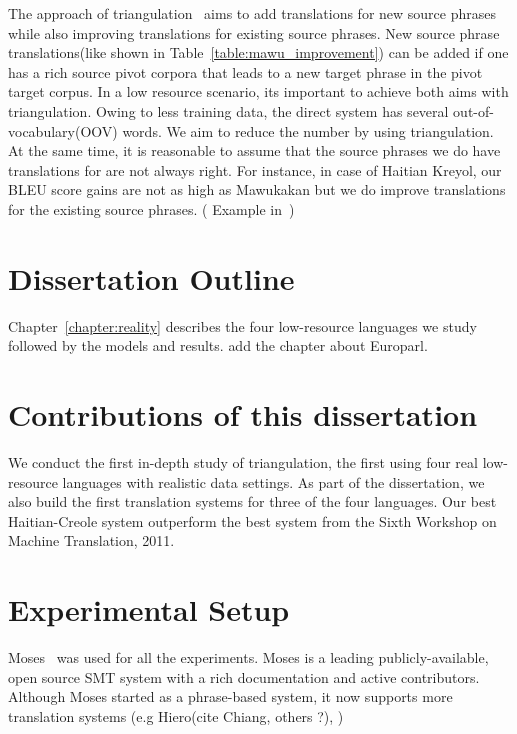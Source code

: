 The approach of triangulation~\cite{Cohn:07,Utiyama:07,Nakov:12} aims to add translations for new source phrases while also improving translations for existing source phrases. New source phrase translations(like shown in Table~\ref{table:mawu_improvement}) can be added if one has a rich source pivot corpora that leads to a new target phrase in the pivot target corpus. In a low resource scenario, its important to achieve both aims with triangulation. Owing to less training data, the direct system has several out-of-vocabulary(OOV) words. We aim to reduce the number by using triangulation. At the same time, it is reasonable to assume that the source phrases we do have translations for are not always right. For instance, in case of Haitian Kreyol, our BLEU score gains are not as high as Mawukakan but we do improve translations for the existing source phrases. ( Example in~)

\section{Dissertation Outline}
\label{sec:outline}
Chapter~\ref{chapter:reality} describes the four low-resource languages we study followed by the models and results. \alert{add the chapter about Europarl}.

\section{Contributions of this dissertation}
\label{sec:summary}
We conduct the first in-depth study of triangulation, the first using four real low-resource languages with realistic data settings. As part of the dissertation, we also build the first translation systems for three of the four languages. Our best Haitian-Creole system outperform the best system from the Sixth Workshop on Machine Translation, 2011. 


\section{Experimental Setup}
\label{sec:setup}


Moses~\cite{Koehn:07} was used for all the experiments. Moses is a leading publicly-available, open source SMT system with a rich documentation and active contributors. Although Moses started as a phrase-based system, it now supports more translation systems (e.g Hiero(\alert{cite Chiang}, others ?), )

